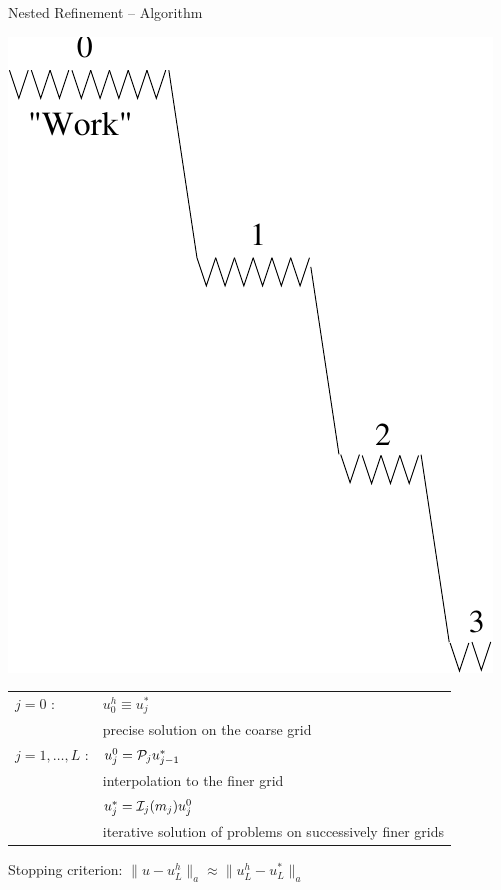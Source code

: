 \documentclass[landscape,pdftex,headrule,footrule]{foils}
\begin{document}
\begin{foil}[-.25in]{Nested Refinement -- Algorithm}
  \begin{minipage}[h]{.3\textwidth}
    \includegraphics[width=\textwidth]{figures/cmg}
  \end{minipage}
  \begin{minipage}[h]{.7\textwidth}
    \begin{tabular}{lp{4in}}
      $j=0$ : &  $u_0^h \equiv u_j^*$ \\
      &  precise solution on the coarse grid\\[2.9ex]
      $j=1,\ldots, L$ : & $u_j^0={\cal P}_j u_{j-1}^*$\\
      & interpolation to the finer grid\\[2.9ex]
      & $u_j^*={\cal I}_j(m_j) u_{j}^0$\\
      & iterative solution of problems
      on successively finer grids \\[2.9ex]
    \end{tabular}
  \end{minipage}
  
  \vspace{1in}
  
  \centerline{\noindent Stopping criterion: $\| u - u^h_L\|_a \approx \|u^h_L - u_L^{*}\|_a$}
\end{foil}
\end{document}
